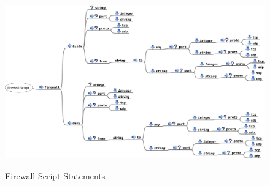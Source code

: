 \begin{figure}
\centering
\includegraphics[width=1.0\textheight]{firewall_service_script}
\label{fig:firewall_script_statements}
\caption{Firewall Script Statements}
\end{figure}

